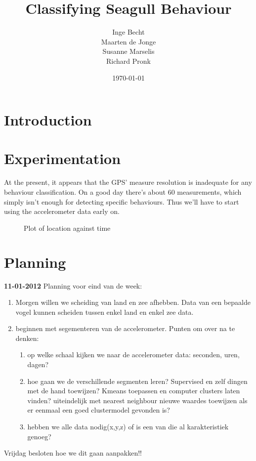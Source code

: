 \documentclass[a4paper]{article}
\begin{document}
\title{Classifying Seagull Behaviour}
\author{Inge Becht \\ Maarten de Jonge \\ Susanne Marselis \\ Richard Pronk}
\date{\today}
\maketitle

\section{Introduction}
\section{Experimentation}
At the present, it appears that the GPS' measure resolution is inadequate for
any behaviour classification. On a good day there's about 60 measurements, which
simply isn't enough for detecting specific behaviours. Thus we'll have to start
using the accelerometer data early on.
\begin{figure}[htb] 
    \begin{center}
        \caption{Plot of location against time}
        \label{fig:scatter}
    \end{center}
\end{figure}




\section{
Planning
}
\textbf{11-01-2012}
Planning voor eind van de week:
\begin{enumerate}
    \item{Morgen willen we scheiding van land en zee afhebben. Data van een
    bepaalde vogel kunnen scheiden tussen enkel land en enkel zee data.}
    \item{beginnen met segementeren van de accelerometer. Punten om over na te denken:}
    \begin{enumerate}
    \item{op welke schaal kijken we naar de accelerometer data: seconden,
            uren, dagen?}
    \item{hoe gaan we de verschillende segmenten leren? 
            Supervised en zelf dingen met de hand toewijzen? Kmeans
                toepassen en computer clusters laten vinden?  
                uiteindelijk met nearest neighbour nieuwe waardes toewijzen als er
                eenmaal een goed clustermodel gevonden is?}
    \item{
            hebben we alle data nodig(x,y,z) of is een van die al karakteristiek genoeg?
        }
    \end{enumerate}
\end{enumerate}
Vrijdag besloten hoe we dit gaan aanpakken!! 
    
\end{document}
